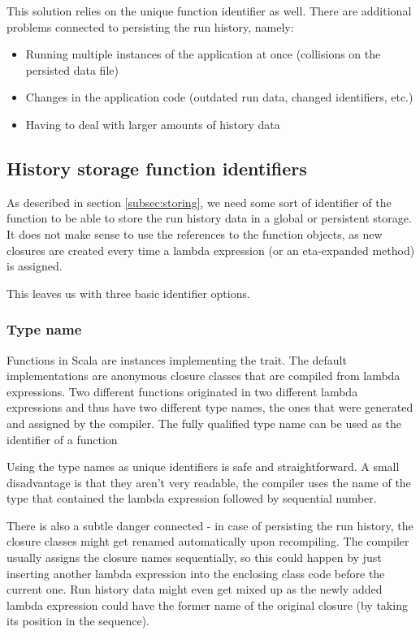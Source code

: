 This solution relies on the unique function identifier as well. There are additional problems connected to persisting the run history, namely:
\begin{itemize}
	\item Running multiple instances of the application at once (collisions on the persisted data file)
	\item Changes in the application code (outdated run data, changed identifiers, etc.)
	\item Having to deal with larger amounts of history data
\end{itemize}

\subsection{History storage function identifiers}
\label{subsec:function_identifiers}

As described in section \ref{subsec:storing}, we need some sort of identifier of the function to be able to store the run history data in a global or persistent storage. It does not make sense to use the references to the function objects, as new closures are created every time a lambda expression (or an eta-expanded method) is assigned.


This leaves us with three basic identifier options.

\subsubsection{Type name}

Functions in Scala are instances implementing the  trait. The default implementations are anonymous closure classes that are compiled from lambda expressions. Two different functions originated in two different lambda expressions and thus have two different type names, the ones that were generated and assigned by the compiler. The fully qualified type name can be used as the identifier of a function

Using the type names as unique identifiers is safe and straightforward. A small disadvantage is that they aren't very readable, the compiler uses the name of the type that contained the lambda expression followed by sequential number. 

There is also a subtle danger connected - in case of persisting the run history, the closure classes might get renamed automatically upon recompiling. The compiler usually assigns the closure names sequentially, so this could happen by just inserting another lambda expression into the enclosing class code before the current one. Run history data might even get mixed up as the newly added lambda expression could have the former name of the original closure (by taking its position in the sequence).

